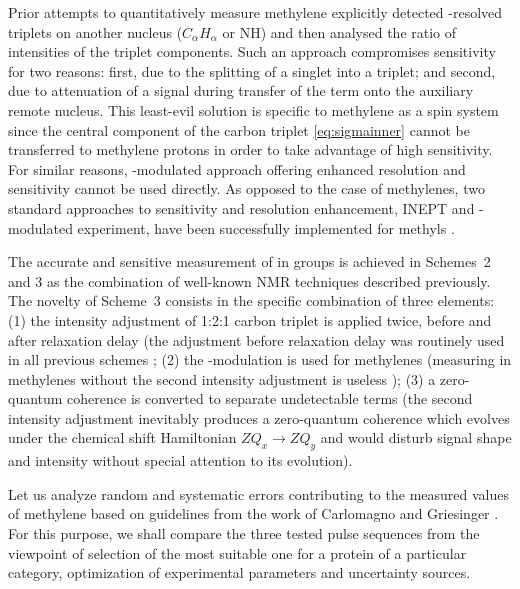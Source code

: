 \documentclass[twocolumn]{svjour3}           %
\begin{document}
Prior attempts to quantitatively measure methylene \gtwoCH{} 
\cite{banci_side_2001,zheng_measurement_2004} explicitly detected
\oneJch-resolved triplets on another nucleus ($C_\alpha H_\alpha$ or NH) 
and then analysed the ratio of intensities of the triplet components.
Such an approach compromises sensitivity for two reasons: first, due 
to the splitting of a singlet into a triplet; and second, due to 
attenuation of a signal during transfer of the term onto the 
auxiliary remote nucleus. This least-evil solution is specific to 
methylene as a spin system since the central component of the carbon 
triplet \eqref{eq:sigmainner} cannot be transferred to methylene 
protons \cite{zhang_probing_2006} in order to take
advantage of high sensitivity. For similar reasons, \oneJch-modulated
approach offering enhanced resolution and sensitivity cannot be used
directly. As opposed to the case of methylenes, two standard approaches 
to sensitivity and resolution enhancement, {INEPT} and 
\oneJch-modulated experiment, have been successfully implemented for 
methyls \cite{zhang_probing_2006,lesovoy_nmr_2017}. 

The accurate and sensitive measurement of \gtwoCH{} in \CHtwo{} groups
is achieved in Schemes~2 and 3 as the combination of well-known NMR
techniques described previously. The novelty of Scheme~3 consists in the specific
combination of three elements: (1) the intensity adjustment of 1:2:1 carbon triplet is
applied twice, before and after relaxation delay 
(the adjustment before relaxation delay was routinely used in all previous schemes
\cite{yang_study_1998,banci_side_2001,zheng_measurement_2004}; 
(2) the \oneJch-modulation is used for methylenes
(measuring \gtwoCH{} in methylenes 
without the second intensity adjustment is useless \cite{yang_probing_2011});
(3) a zero-quantum coherence is converted to separate undetectable terms (the second intensity adjustment inevitably produces a zero-quantum 
coherence which evolves under the chemical shift Hamiltonian 
$ZQ_x\xrightarrow{} ZQ_y$ and would disturb signal shape and intensity without special attention to its evolution).

Let us analyze random and systematic errors contributing to the measured
values of methylene \gtwoCH{} based on guidelines 
from the work of Carlomagno and Griesinger \cite{carlomagno_errors_2000}. 
For this purpose, we shall compare the three 
tested pulse sequences from the viewpoint of selection of the most 
suitable one for a protein of a particular category, optimization of
experimental parameters and uncertainty sources.
\end{document}
